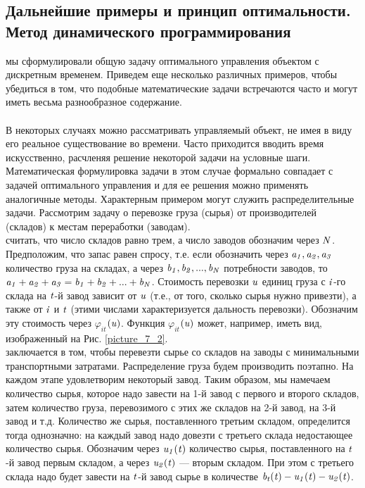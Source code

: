 \subsection{ Дальнейшие примеры и принцип оптимальности. Метод динамического программирования}
\indent{} мы сформулировали общую задачу оптимального управления объектом с дискретным временем. Приведем еще несколько различных примеров, чтобы убедиться в том, что подобные математические задачи встречаются часто и могут иметь весьма разнообразное содержание.\\\\
 В некоторых случаях можно рассматривать управляемый объект, не имея в виду его реальное существование во времени. Часто приходится вводить время искусственно, расчленяя решение некоторой задачи на условные шаги. Математическая формулировка задачи в этом случае формально совпадает с задачей оптимального управления и для ее решения можно применять аналогичные методы. Характерным примером могут служить распределительные задачи. Рассмотрим задачу о перевозке груза (сырья) от производителей (складов) к местам переработки (заводам). \\
 считать, что число складов равно трем, а число заводов обозначим через $\it N$. Предположим, что запас равен спросу, т.е. если обозначить через $\it a_1, a_2, a_3$ количество груза на складах, а через $\it b_1, b_2 , ..., b_N$ потребности заводов, то  $\it a_1+a_2+a_3=b_1+b_2+...+b_N$. Стоимость перевозки  $\it u$ единиц груза с $\it i$-го склада на  $\it t$-й завод зависит от $\it u$ (т.е.,
от того, сколько сырья нужно привезти), а также от  $\it i$ и $\it t$  (этими числами характеризуется дальность перевозки). Обозначим эту стоимость через $\varphi_{it}$$\it (u)$. Функция   $\varphi_{it}$$\it (u)$ может, например, иметь вид, изображенный на Рис. \ref{picture_7_2}.\\
 заключается в том, чтобы перевезти сырье со складов на заводы с минимальными транспортными затратами. Распределение груза будем производить поэтапно. На каждом этапе удовлетворим некоторый завод. Таким образом, мы намечаем количество сырья, которое надо завести на 1-й завод с первого и второго складов, затем количество груза, перевозимого с этих же складов на 2-й завод, на 3-й завод и т.д. Количество же сырья, поставленного третьим складом, определится тогда однозначно: на каждый завод надо довезти с третьего склада недостающее количество сырья. Обозначим через $\it u_1(t)$ количество сырья, поставленного на $\it t$-й завод первым складом, а через $\it u_2(t)$ — вторым складом. При этом с третьего склада надо будет завести на $\it t$-й завод сырье в количестве $\it b_t(t)-u_1(t)-u_2(t)$.

